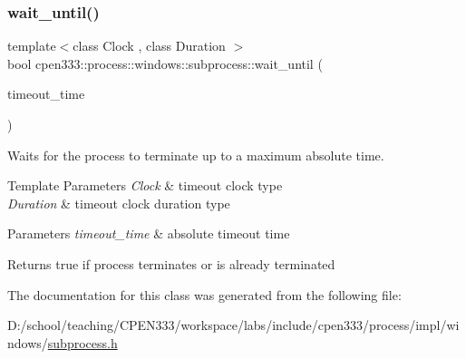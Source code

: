 \subsubsection{\texorpdfstring{wait\+\_\+until()}{wait\_until()}}
{\footnotesize\ttfamily template$<$class Clock , class Duration $>$ \\
bool cpen333\+::process\+::windows\+::subprocess\+::wait\+\_\+until (\begin{DoxyParamCaption}\item[{const std\+::chrono\+::time\+\_\+point$<$ Clock, Duration $>$ \&}]{timeout\+\_\+time }\end{DoxyParamCaption})\hspace{0.3cm}{\ttfamily [inline]}}



Waits for the process to terminate up to a maximum absolute time. 


\begin{DoxyTemplParams}{Template Parameters}
{\em Clock} & timeout clock type \\
\hline
{\em Duration} & timeout clock duration type \\
\hline
\end{DoxyTemplParams}

\begin{DoxyParams}{Parameters}
{\em timeout\+\_\+time} & absolute timeout time \\
\hline
\end{DoxyParams}
\begin{DoxyReturn}{Returns}
true if process terminates or is already terminated 
\end{DoxyReturn}


The documentation for this class was generated from the following file\+:\begin{DoxyCompactItemize}
\item 
D\+:/school/teaching/\+C\+P\+E\+N333/workspace/labs/include/cpen333/process/impl/windows/\hyperlink{impl_2windows_2subprocess_8h}{subprocess.\+h}\end{DoxyCompactItemize}

